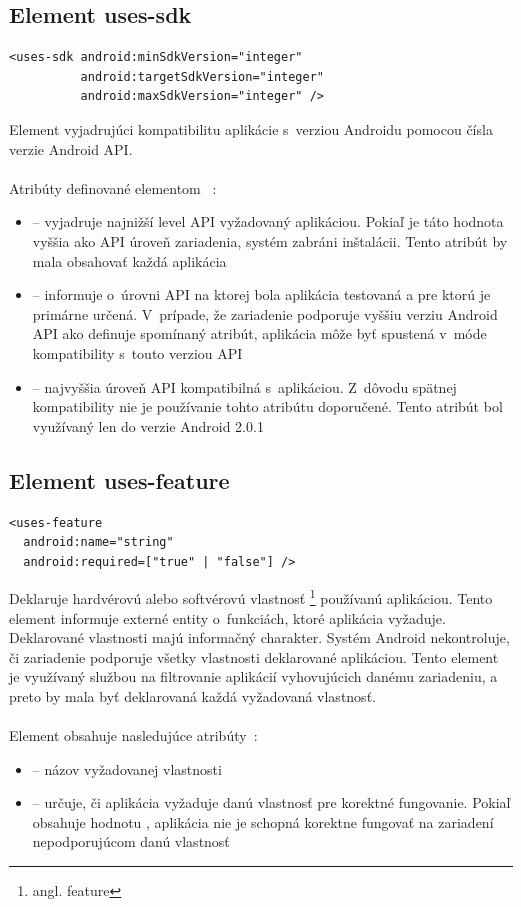 \subsection{Element uses-sdk}
\lstset{language=XML}
\begin{lstlisting}
<uses-sdk android:minSdkVersion="integer"
          android:targetSdkVersion="integer"
          android:maxSdkVersion="integer" />
\end{lstlisting}
Element vyjadrujúci kompatibilitu aplikácie s~verziou Androidu pomocou čísla verzie Android API.\\\\
Atribúty definované elementom ~\cite{elUsesSdk}:\\
\begin{itemize}
\item {} -- vyjadruje najnižší level API vyžadovaný aplikáciou. Pokiaľ je táto hodnota vyššia ako API úroveň zariadenia, systém zabráni inštalácii. Tento atribút by mala obsahovať každá aplikácia
\item {} -- informuje o~úrovni API na ktorej bola aplikácia testovaná a pre ktorú je primárne určená. V~prípade, že zariadenie podporuje vyššiu verziu Android API ako definuje spomínaný atribút, aplikácia môže byť spustená v~móde kompatibility s~touto verziou API 
\item {} -- najvyššia úroveň API kompatibilná s~aplikáciou. Z~dôvodu spätnej kompatibility nie je používanie tohto atribútu doporučené. Tento atribút bol využívaný len do verzie Android 2.0.1
\end{itemize}

\subsection{Element uses-feature}
\label{el_uses-feature}
\lstset{language=XML}
\begin{lstlisting}
<uses-feature
  android:name="string"
  android:required=["true" | "false"] />
\end{lstlisting}
Deklaruje hardvérovú alebo softvérovú vlastnosť \footnote{angl. feature} používanú aplikáciou. Tento element informuje externé entity o~funkciách, ktoré aplikácia vyžaduje. Deklarované vlastnosti majú informačný charakter. Systém Android nekontroluje, či zariadenie podporuje všetky vlastnosti deklarované aplikáciou. Tento element je využívaný službou  na  filtrovanie aplikácií vyhovujúcich danému zariadeniu, a preto by mala byť deklarovaná každá vyžadovaná vlastnosť.\\\\ Element obsahuje nasledujúce atribúty~\cite{elUsesFeature}:\\
\begin{itemize}
\item {} -- názov vyžadovanej vlastnosti
\item {} -- určuje, či aplikácia vyžaduje danú vlastnosť pre korektné fungovanie. Pokiaľ obsahuje hodnotu , aplikácia nie je schopná korektne fungovať na zariadení nepodporujúcom danú vlastnosť
\end{itemize}

